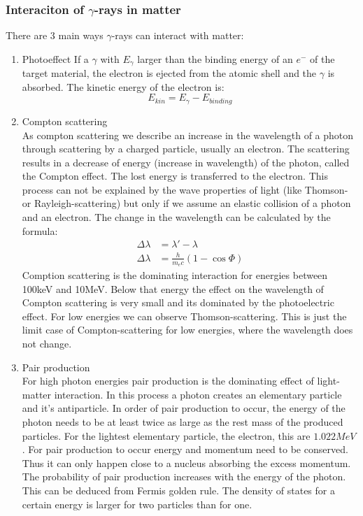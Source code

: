 \documentclass[]{article}
\begin{document}
\subsubsection{Interaciton of $\gamma$-rays in matter}
There are 3 main ways $\gamma$-rays can interact with matter:
\begin{enumerate}
	\item Photoeffect \newline
	If a $\gamma$ with $E_{\gamma}$ larger than the binding energy of an $e^-$ of the target material, the electron is ejected from the atomic shell and the $\gamma$ is absorbed. The kinetic energy of the electron is:
	\begin{equation}
		E_{kin}=E_{\gamma}-E_{binding}
	\end{equation}
	\item Compton scattering \\
	As compton scattering we describe an increase in the wavelength of a photon through scattering by a charged particle, usually an electron. The scattering results in a decrease of energy (increase in wavelength) of the photon, called the Compton effect. The lost energy is transferred to the electron. This process can not be explained by the wave properties of light (like Thomson- or Rayleigh-scattering) but only if we assume an elastic collision of a photon and an electron. The change in the wavelength can be calculated by the formula:
	\begin{align}\label{comption}
		\Delta \lambda&=\lambda'-\lambda \nonumber \\ 
		\Delta \lambda&=\frac{h}{m_e c}(1-\cos \Phi)		
	\end{align}
	Comption scattering is the dominating interaction for energies between 100keV and 10MeV. Below that energy the effect on the wavelength of Compton scattering is very small and its dominated by the photoelectric effect. For low energies we can observe Thomson-scattering. This is just the limit case of Compton-scattering for low energies, where the wavelength does not change.
	

	\item Pair production \\
	For high photon energies pair production is the dominating effect of light-matter interaction. In this process a photon creates an elementary particle and it's antiparticle. In order of pair production to occur, the energy of the photon needs to be at least twice as large as the rest mass of the produced particles. For the lightest elementary particle, the electron, this are  $1.022MeV$. For pair production to occur energy and momentum need to be conserved. Thus it can only happen close to a nucleus absorbing the excess momentum. The probability of pair production increases with the energy of the photon. This can be deduced from Fermis golden rule. The density of states for a certain energy is larger for two particles than for one.
\end{enumerate}
\end{document}
